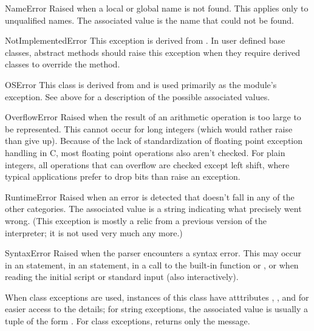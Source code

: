 \begin{excdesc}{NameError}
  Raised when a local or global name is not found.  This applies only
  to unqualified names.  The associated value is the name that could
  not be found.
\end{excdesc}

\begin{excdesc}{NotImplementedError}
  This exception is derived from .  In user
  defined base classes, abstract methods should raise this exception
  when they require derived classes to override the method.
\end{excdesc}

\begin{excdesc}{OSError}
  This class is derived from  and is used
  primarily as the  module's  exception.
  See  above for a description of the
  possible associated values.
\end{excdesc}

\begin{excdesc}{OverflowError}
  Raised when the result of an arithmetic operation is too large to be
  represented.  This cannot occur for long integers (which would rather
  raise  than give up).  Because of the lack of
  standardization of floating point exception handling in C, most
  floating point operations also aren't checked.  For plain integers,
  all operations that can overflow are checked except left shift, where
  typical applications prefer to drop bits than raise an exception.
\end{excdesc}

\begin{excdesc}{RuntimeError}
  Raised when an error is detected that doesn't fall in any of the
  other categories.  The associated value is a string indicating what
  precisely went wrong.  (This exception is mostly a relic from a
  previous version of the interpreter; it is not used very much any
  more.)
\end{excdesc}

\begin{excdesc}{SyntaxError}
  Raised when the parser encounters a syntax error.  This may occur in
  an  statement, in an  statement, in a call
  to the built-in function  or , or
  when reading the initial script or standard input (also
  interactively).

When class exceptions are used, instances of this class have
atttributes , ,  and
 for easier access to the details; for string exceptions,
the associated value is usually a tuple of the form
.
For class exceptions,  returns only the message.
\end{excdesc}


